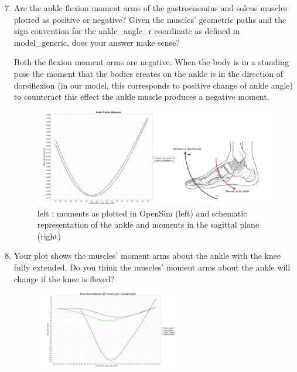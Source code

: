 \documentclass[11pt]{article}
\begin{document}
\begin{enumerate}
    \setcounter{enumi}{6}
    \item Are the ankle flexion moment arms of the gastrocnemius and soleus muscles plotted as positive or negative? Given the muscles’ geometric paths and the sign convention for the ankle\_angle\_r coordinate as defined in model\_generic, does your answer make sense?
    \begin{adjustwidth}{0.5cm}{}
        Both the flexion moment arms are negative. When the body is in a standing pose the moment that the bodies creates on the ankle is in the direction of dorsiflexion (in our model, this corresponds to positive change of ankle angle) to counteract this effect the ankle muscle produces a negative moment.
        \begin{figure}[h!]
            \centering
            \includegraphics[width=\textwidth]{screens/compound.png}
            \caption{left : moments as plotted in OpenSim (left) and schematic representation of the ankle and moments in the sagittal plane (right)}
        \end{figure}
    \end{adjustwidth}
    \item Your plot shows the muscles’ moment arms about the ankle with the knee fully extended. Do you think the muscles’ moment arms about the ankle will change if the knee is flexed?
    \begin{adjustwidth}{0.5cm}{}
        \begin{figure}[h!]
            \centering
            \includegraphics[width=0.6\textwidth]{screens/flexed_straight.jpg}

\end{figure}
\end{adjustwidth}
\end{enumerate}
\end{document}

